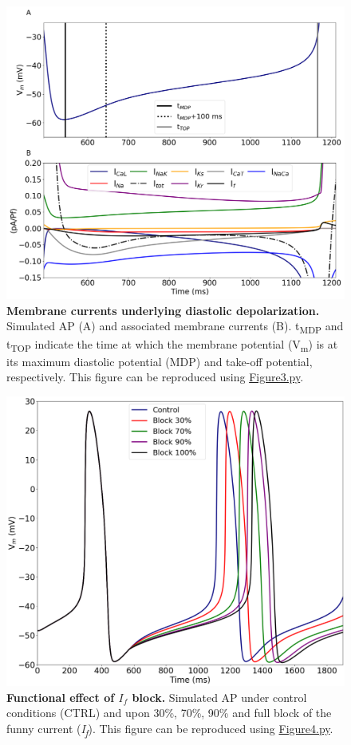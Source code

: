 \documentclass[fleqn,10pt]{physiome}
\begin{document}
\begin{figure}[htb]
\centering
\includegraphics[width=0.8\linewidth]{Figure3}\newline
\caption{\textbf{Membrane currents underlying diastolic depolarization.}\newline
Simulated AP (A) and associated membrane currents (B). t\textsubscript{MDP} and t\textsubscript{TOP} indicate the time at which the membrane potential (V\textsubscript{m}) is at its maximum diastolic potential (MDP) and take-off potential, respectively. This figure can be reproduced using \href{https://models.physiomeproject.org/workspace/648/rawfile/6784d6c3256c832dc98b2db42c85747ae2596518/Figure3.py}{Figure3.py}.}
\label{Figure3}
\end{figure}

\begin{figure}[htb!]
\centering
\includegraphics[width=0.7\linewidth]{Figure4}
\caption{\textbf{Functional effect of $I_{f}$ block.}\newline
Simulated AP under control conditions (CTRL) and upon 30\%, 70\%, 90\% and full block of the funny current (\textit{I\textsubscript{f}}). This figure can be reproduced using \href{https://models.physiomeproject.org/workspace/648/rawfile/6784d6c3256c832dc98b2db42c85747ae2596518/Figure4.py}{Figure4.py}.}
\label{Figure4}
\end{figure}
\end{document}
